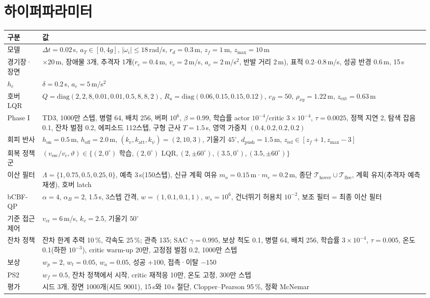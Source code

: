 \documentclass[10pt,a4paper]{article}
\newcommand{\Term}{\mathcal{T}}
\begin{document}
\section{하이퍼파라미터}\label{app:hparams}
\begin{center}\small
\begin{tabularx}{\linewidth}{>{\raggedright\arraybackslash}p{3.0cm}>{\raggedright\arraybackslash}X}\toprule
구분 & 값 \\\midrule
모델 & $\Delta t=0.02$\,s, $a_T\in[0,4g]$, $|\omega_i|\le18$\,rad/s, $r_d=0.3$\,m, $z_f=1$\,m, $z_{\max}=10$\,m \\
경기장·장면 & 40$\times$20\,m, 장애물 3개, 추격자 1개($r_c=0.4$\,m, $v_c=2$\,m/s, $a_c=2$\,m/s$^2$, 반발 거리 2\,m), 표적 0.2--0.8\,m/s, 성공 반경 0.6\,m, 15\,s \\
$h_c$ & $\delta=0.2$\,s, $a_e=5$\,m/s$^2$ \\
호버 LQR & $Q=\mathrm{diag}(2,2,8,0.01,0.01,0.5,8,8,2)$, $R_u=\mathrm{diag}(0.06,0.15,0.15,0.12)$, $c_B=50$, $\rho_{xy}=1.22$\,m, $z_{\mathrm{ext}}=0.63$\,m \\
Phase I & TD3, 1000만 스텝, 병렬 64, 배치 256, 버퍼 $10^6$, $\beta=0.99$, 학습률 actor $10^{-4}$/critic $3\times10^{-4}$, $\tau=0.0025$, 정책 지연 2, 탐색 잡음 0.1, 잔차 벌점 0.2, 에피소드 112스텝, 구형 근사 $T=1.5$\,s, 영역 가중치 $(0.4,0.2,0.2,0.2)$ \\
회피 반사 & $h_{\mathrm{on}}=0.5$\,m, $h_{\mathrm{off}}=2.0$\,m, $(k_v,k_{\mathrm{att}},k_\psi)=(2,10,3)$, 기울기 $45^\circ$, $d_{\mathrm{push}}=1.5$\,m, $z_{\mathrm{ref}}\in[z_f+1,z_{\max}-3]$ \\
회복 정책군 & $(v_{\mathrm{esc}}/v_c,\vartheta)\in\{(2,0^\circ)\text{ 학습},(2,0^\circ)\text{ LQR},(2,\pm60^\circ),(3.5,0^\circ),(3.5,\pm60^\circ)\}$ \\
이산 필터 & $\Lambda=\{1,0.75,0.5,0.25,0\}$, 예측 3\,s(150스텝), 신규 계획 여유 $m_o=0.15$\,m·$m_c=0.2$\,m, 종단 $\Term_{\mathrm{hover}}\cup\Term_{\mathrm{flee}}$, 계획 유지(추격자 예측 재생), 호버 latch \\
bCBF-QP & $\alpha=4$, $\alpha_B=2$, 1.5\,s, 3스텝 간격, $w=(1,0.1,0.1,1)$, $w_s=10^6$, 건너뛰기 허용치 $10^{-2}$, 보조 필터 = 최종 이산 필터 \\
기준 접근 제어 & $v_{\mathrm{cr}}=6$\,m/s, $k_v=2.5$, 기울기 $50^\circ$ \\
잔차 정책 & 잔차 한계 추력 10\,\%, 각속도 25\,\%; 관측 135; SAC $\gamma=0.995$, 보상 척도 0.1, 병렬 64, 배치 256, 학습률 $3\times10^{-4}$, $\tau=0.005$, 온도 0.1(하한 $10^{-3}$), critic warm-up 20만, 고정점 벌점 0.2, 1000만 스텝 \\
보상 & $w_p=2$, $w_t=0.05$, $w_a=0.05$, 성공 $+100$, 접촉·이탈 $-150$ \\
PS2 & $w_f=0.5$, 잔차 정책에서 시작, critic 재적응 10만, 온도 고정, 300만 스텝 \\
평가 & 시드 3개, 장면 1000개(시드 9001), 15\,s와 10\,s 절단, Clopper--Pearson 95\,\%, 정확 McNemar \\\bottomrule
\end{tabularx}
\end{center}
\end{document}
